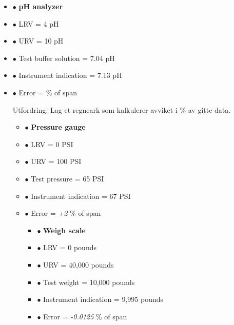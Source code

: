 \begin{itemize}
\begin{itemize}
\begin{itemize}
\vskip 10pt

\begin{itemize}
\item{$\bullet$} {\bf pH analyzer}
\item{$\bullet$} LRV = 4 pH
\item{$\bullet$} URV = 10 pH
\item{$\bullet$} Test buffer solution = 7.04 pH
\item{$\bullet$} Instrument indication = 7.13 pH
\item{$\bullet$} Error = \underbar{\hskip 50pt} \% of span
\medskip

\vskip 10pt


\vskip 10pt


Utfordring: Lag et regneark som kalkulerer avviket i \% av gitte data. 







\begin{itemize}
\item{$\bullet$} {\bf Pressure gauge}
\item{$\bullet$} LRV = 0 PSI
\item{$\bullet$} URV = 100 PSI 
\item{$\bullet$} Test pressure = 65 PSI 
\item{$\bullet$} Instrument indication = 67 PSI
\item{$\bullet$} Error = {\it +2} \% of span
\medskip

\vskip 10pt

\begin{itemize}
\item{$\bullet$} {\bf Weigh scale}
\item{$\bullet$} LRV = 0 pounds
\item{$\bullet$} URV = 40,000 pounds
\item{$\bullet$} Test weight = 10,000 pounds
\item{$\bullet$} Instrument indication = 9,995 pounds
\item{$\bullet$} Error = {\it -0.0125} \% of span
\medskip


\end{itemize}
\end{itemize}
\end{itemize}
\end{itemize}
\end{itemize}
\end{itemize}
